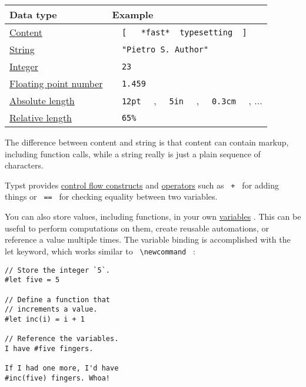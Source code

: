 \begin{longtable}[]{@{}ll@{}}
\toprule\noalign{}
Data type & Example \\
\midrule\noalign{}
\endhead
\bottomrule\noalign{}
\endlastfoot
\href{/docs/reference/foundations/content/}{Content} &
\texttt{\ }{\texttt{\ {[}\ }}\texttt{\ }{\texttt{\ *fast*\ }}\texttt{\ typesetting\ }{\texttt{\ {]}\ }}\texttt{\ } \\
\href{/docs/reference/foundations/str/}{String} &
\texttt{\ }{\texttt{\ "Pietro\ S.\ Author"\ }}\texttt{\ } \\
\href{/docs/reference/foundations/int/}{Integer} &
\texttt{\ }{\texttt{\ 23\ }}\texttt{\ } \\
\href{/docs/reference/foundations/float/}{Floating point number} &
\texttt{\ }{\texttt{\ 1.459\ }}\texttt{\ } \\
\href{/docs/reference/layout/length/}{Absolute length} &
\texttt{\ }{\texttt{\ 12pt\ }}\texttt{\ } ,
\texttt{\ }{\texttt{\ 5in\ }}\texttt{\ } ,
\texttt{\ }{\texttt{\ 0.3cm\ }}\texttt{\ } , ... \\
\href{/docs/reference/layout/ratio/}{Relative length} &
\texttt{\ }{\texttt{\ 65\%\ }}\texttt{\ } \\
\end{longtable}

The difference between content and string is that content can contain
markup, including function calls, while a string really is just a plain
sequence of characters.

Typst provides \href{/docs/reference/scripting/\#conditionals}{control
flow constructs} and
\href{/docs/reference/scripting/\#operators}{operators} such as
\texttt{\ +\ } for adding things or \texttt{\ ==\ } for checking
equality between two variables.

You can also store values, including functions, in your own
\href{/docs/reference/scripting/\#bindings}{variables} . This can be
useful to perform computations on them, create reusable automations, or
reference a value multiple times. The variable binding is accomplished
with the let keyword, which works similar to
\texttt{\ \textbackslash{}newcommand\ } :

\begin{verbatim}
// Store the integer `5`.
#let five = 5

// Define a function that
// increments a value.
#let inc(i) = i + 1

// Reference the variables.
I have #five fingers.

If I had one more, I'd have
#inc(five) fingers. Whoa!
\end{verbatim}

